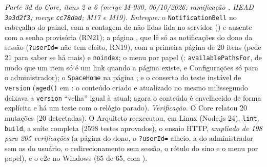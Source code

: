 \emph{Parte 3d do Core, itens 2 a 6 (merge M-030, 06/10/2026; ramificação , HEAD \texttt{3a3d2f3}; merge \texttt{cc78dad}; M17 e M19).} \emph{Entregue:} o \texttt{NotificationBell} no cabeçalho do painel, com a contagem de não lidas lida no servidor () e ausente com a senha provisória (RN21); a página , que lê só as notificações do dono da sessão (\texttt{?userId=} não tem efeito, RN19), com a primeira página de 20 itens (pede 21 para saber se há mais) e \texttt{noindex}; o menu por papel (: \texttt{availablePathsFor}, de modo que um item só é um link quando a página existe, e Configurações só para o administrador); o \texttt{SpaceHome} na página \arq{/[handle]}; e o conserto do teste instável de \texttt{version} (\texttt{aged()} em : o conteúdo criado e atualizado no mesmo milissegundo deixava a \texttt{version} ``velha'' igual à atual; agora o conteúdo é envelhecido de forma explícita e há um teste com o relógio parado). \emph{Verificação.} O Core relatou 20 mutações (20 detectadas). O Arquiteto reexecutou, em Linux (Node.js 24), \texttt{lint}, \texttt{build}, a suíte completa (2598 testes aprovados), o ensaio HTTP, \emph{ampliado de 198 para 205 verificações} (a página do dono, o \texttt{?userId=} alheio, a do administrador sem as do usuário, o redirecionamento sem sessão, o rótulo do sino e o menu por papel), e o e2e no Windows (65 de 65, com ).

